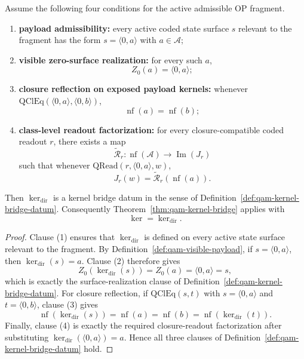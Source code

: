 \begin{theorem}\label{thm:qam-direct-kernel-constructor}
Assume the following four conditions for the active admissible OP fragment.
\begin{enumerate}
\item \textbf{payload admissibility:} every active coded state surface $s$ relevant to the fragment has the form $s=\langle 0,a\rangle$ with $a\in\mathcal A$;
\item \textbf{visible zero-surface realization:} for every such $a$,
\[
Z_0(a)=\langle 0,a\rangle;
\]
\item \textbf{closure reflection on exposed payload kernels:} whenever $\mathrm{QClEq}(\langle 0,a\rangle,\langle 0,b\rangle)$,
\[
\operatorname{nf}(a)=\operatorname{nf}(b);
\]
\item \textbf{class-level readout factorization:} for every closure-compatible coded readout $r$, there exists a map
\[
\widetilde{\mathcal R}_r:\operatorname{nf}(\mathcal A)\to \operatorname{Im}(J_r)
\]
such that whenever $\mathrm{QRead}(r,\langle 0,a\rangle,w)$,
\[
J_r(w)=\widetilde{\mathcal R}_r(\operatorname{nf}(a)).
\]
\end{enumerate}
Then $\operatorname{ker}_{\mathrm{dir}}$ is a kernel bridge datum in the sense of Definition~\ref{def:qam-kernel-bridge-datum}. Consequently Theorem~\ref{thm:qam-kernel-bridge} applies with
\[
\operatorname{ker}=\operatorname{ker}_{\mathrm{dir}}.
\]
\end{theorem}

\begin{proof}
Clause (1) ensures that $\operatorname{ker}_{\mathrm{dir}}$ is defined on every active state surface relevant to the fragment. By Definition~\ref{def:qam-visible-payload}, if $s=\langle 0,a\rangle$, then $\operatorname{ker}_{\mathrm{dir}}(s)=a$. Clause (2) therefore gives
\[
Z_0(\operatorname{ker}_{\mathrm{dir}}(s))=Z_0(a)=\langle 0,a\rangle=s,
\]
which is exactly the surface-realization clause of Definition~\ref{def:qam-kernel-bridge-datum}. For closure reflection, if $\mathrm{QClEq}(s,t)$ with $s=\langle 0,a\rangle$ and $t=\langle 0,b\rangle$, clause (3) gives
\[
\operatorname{nf}(\operatorname{ker}_{\mathrm{dir}}(s))=\operatorname{nf}(a)=\operatorname{nf}(b)=\operatorname{nf}(\operatorname{ker}_{\mathrm{dir}}(t)).
\]
Finally, clause (4) is exactly the required closure-readout factorization after substituting $\operatorname{ker}_{\mathrm{dir}}(\langle 0,a\rangle)=a$. Hence all three clauses of Definition~\ref{def:qam-kernel-bridge-datum} hold.
\end{proof}

